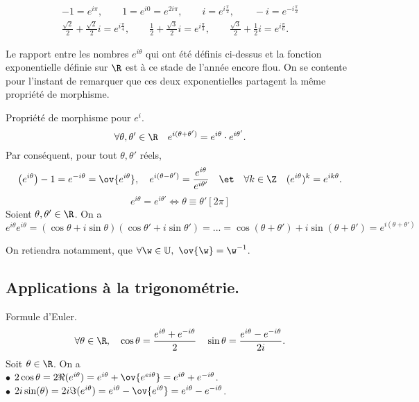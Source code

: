 \documentclass[11pt]{article}
\newcommand*{\U}{\mathbb{U}}
\begin{document}
\begin{ex}{}{}
    \begin{align*}
        -1=e^{i\pi},\qquad 1=e^{i0}=e^{2i\pi}, \qquad i=e^{i\frac{\pi}{2}}, \qquad -i=e^{-i\frac{\pi}{2}}\\
        \frac{\sqrt{2}}{2}+\frac{\sqrt{2}}{2}i=e^{i\frac{\pi}{4}}, \qquad \frac{1}{2}+\frac{\sqrt{3}}{2}i=e^{i\frac{\pi}{3}}, \qquad \frac{\sqrt{3}}{2}+\frac{1}{2}i=e^{i\frac{\pi}{6}}.
    \end{align*}
\end{ex}

\quad Le rapport entre les nombres $e^{i\theta}$ qui ont été définis ci-dessus et la fonction exponentielle définie sur $\R$ est à ce stade de l'année encore flou. On se contente pour l'instant de remarquer que ces deux exponentielles partagent la même propriété de morphisme.

\begin{prop}{Propriété de morphisme pour $e^i$.}{}
    \begin{equation*}
        \forall \theta,\theta'\in\R\quad e^{i(\theta+\theta')}=e^{i\theta}\cdot e^{i\theta'}.
    \end{equation*}
    Par conséquent, pour tout $\theta,\theta'$ réels,
    \begin{equation*}
        \left( e^{i\theta} \right)-1=e^{-i\theta}=\ov{e^{i\theta}},\quad e^{i(\theta-\theta')}=\frac{e^{i\theta}}{e^{i\theta'}}\quad\et\quad \forall k\in\Z\quad (e^{i\theta})^k=e^{ik\theta}.
    \end{equation*}
    \begin{equation*}
        e^{i\theta}=e^{i\theta'}\iff\theta\equiv\theta'[2\pi]
    \end{equation*}
    \tcblower
    Soient $\theta,\theta'\in\R$. On a
    \begin{equation*}
        e^{i\theta}e^{i\theta}=(\cos\theta+i\sin\theta)(\cos\theta'+i\sin\theta')=...=\cos(\theta+\theta')+i\sin(\theta+\theta')=e^{i(\theta+\theta')}
    \end{equation*}
\end{prop}

On retiendra notamment, que $\forall \w \in \U,~\ov{\w}=\w^{-1}$.

\subsection{Applications à la trigonométrie.}

\begin{prop}{Formule d'Euler.}{}
    \begin{equation*}
        \forall \theta \in \R, \quad \cos\theta=\frac{e^{i\theta}+e^{-i\theta}}{2}\quad\sin \theta=\frac{e^{i\theta}-e^{-i\theta}}{2i}.
    \end{equation*}
    \tcblower
    Soit $\theta\in\R$. On a\\
    $\bullet$  $2\cos\theta=2\Re(e^{i\theta})=e^{i\theta}+\ov{e^{ei\theta}}=e^{i\theta}+e^{-i\theta}$.\\
    $\bullet$ $2i\sin(\theta)=2i\Im(e^{i\theta})=e^{i\theta}-\ov{e^{i\theta}}=e^{i\theta}-e^{-i\theta}$.
\end{prop}
\end{document}
